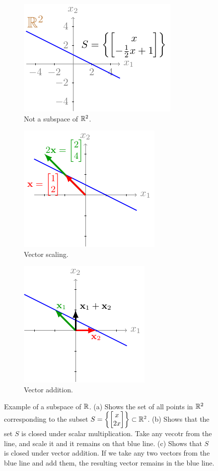 \begin{figure}[h]
    \centering
    \begin{subfigure}[b]{0.32\textwidth}
        \includegraphics{figure/chapter01/nosubspace1(a).pdf}
        \caption{Not a subspace of $\mathbb{R}^2$.}
        \label{fig:nosubspace1}
    \end{subfigure}
    \begin{subfigure}[b]{0.32\textwidth}
        \centering
        \includegraphics{figure/chapter01/nosubspace1(b).pdf}
        \caption{Vector scaling.}
        \label{fig:nosubspace1-scale}
    \end{subfigure}
    \begin{subfigure}[b]{0.32\textwidth}
        \centering
        \includegraphics{figure/chapter01/nosubspace1(c).pdf}
        \caption{Vector addition.}
        \label{fig:nosubspace1-addition}
    \end{subfigure}
    \caption{Example of a subspace of $\mathbb{R}$. (a) Shows the set of all points in $\mathbb{R}^2$ corresponding to the subset $S = \left\{ \bmxc x \\ 2 x\emx\right\} \subset \mb{R}^2$. (b) Shows that the set $S$ is closed under scalar multiplication. Take any vecotr from the line, and scale it and it remains on that blue line. (c) Shows that $S$ is closed under vector addition. If we take any two vectors from the blue line and add them, the resulting vector remains in the blue line.}
\end{figure}

